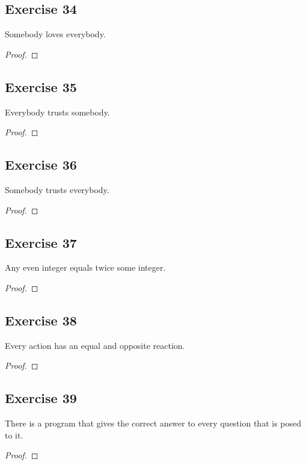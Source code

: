 \documentclass[14pt]{extarticle}
\begin{document}
\subsection{Exercise 34}
Somebody loves everybody.

\begin{proof}

\end{proof}

\subsection{Exercise 35}
Everybody trusts somebody.

\begin{proof}

\end{proof}

\subsection{Exercise 36}
Somebody trusts everybody.

\begin{proof}

\end{proof}

\subsection{Exercise 37}
Any even integer equals twice some integer.

\begin{proof}

\end{proof}

\subsection{Exercise 38}
Every action has an equal and opposite reaction.

\begin{proof}

\end{proof}

\subsection{Exercise 39}
There is a program that gives the correct answer to every question that is posed to it.

\begin{proof}

\end{proof}
\end{document}
